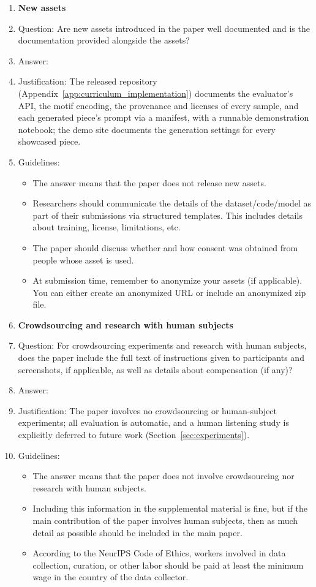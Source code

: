\documentclass{article}
\begin{document}
\begin{enumerate}
\item {\bf New assets}
    \item[] Question: Are new assets introduced in the paper well documented and is the documentation provided alongside the assets?
    \item[] Answer: \answerYes{}
    \item[] Justification: The released repository (Appendix~\ref{app:curriculum_implementation}) documents the evaluator's API, the motif encoding, the provenance and licenses of every sample, and each generated piece's prompt via a manifest, with a runnable demonstration notebook; the demo site documents the generation settings for every showcased piece.
    \item[] Guidelines:
    \begin{itemize}
        \item The answer \answerNA{} means that the paper does not release new assets.
        \item Researchers should communicate the details of the dataset\slash code\slash model as part of their submissions via structured templates. This includes details about training, license, limitations, etc. 
        \item The paper should discuss whether and how consent was obtained from people whose asset is used.
        \item At submission time, remember to anonymize your assets (if applicable). You can either create an anonymized URL or include an anonymized zip file.
    \end{itemize}

\item {\bf Crowdsourcing and research with human subjects}
    \item[] Question: For crowdsourcing experiments and research with human subjects, does the paper include the full text of instructions given to participants and screenshots, if applicable, as well as details about compensation (if any)?
    \item[] Answer: \answerNA{}
    \item[] Justification: The paper involves no crowdsourcing or human-subject experiments; all evaluation is automatic, and a human listening study is explicitly deferred to future work (Section~\ref{sec:experiments}).
    \item[] Guidelines:
    \begin{itemize}
        \item The answer \answerNA{} means that the paper does not involve crowdsourcing nor research with human subjects.
        \item Including this information in the supplemental material is fine, but if the main contribution of the paper involves human subjects, then as much detail as possible should be included in the main paper. 
        \item According to the NeurIPS Code of Ethics, workers involved in data collection, curation, or other labor should be paid at least the minimum wage in the country of the data collector. 
    \end{itemize}


\end{enumerate}
\end{document}

